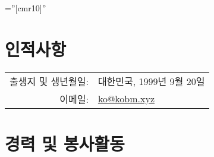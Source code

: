 \documentclass[a4paper]{article} %
\begin{document}
\pagestyle{empty} %

\font\fb=''[cmr10]'' %


\par{\bigskip\par} %

\section{인적사항}

\begin{tabular}{rl}
\textsc{출생지 및 생년월일:} & 대한민국, 1999년 9월 20일 \\
\textsc{이메일:} & \href{mailto:ko@kobm.xyz}{ko@kobm.xyz}
\end{tabular}


\section{경력 및 봉사활동}
\end{document}
